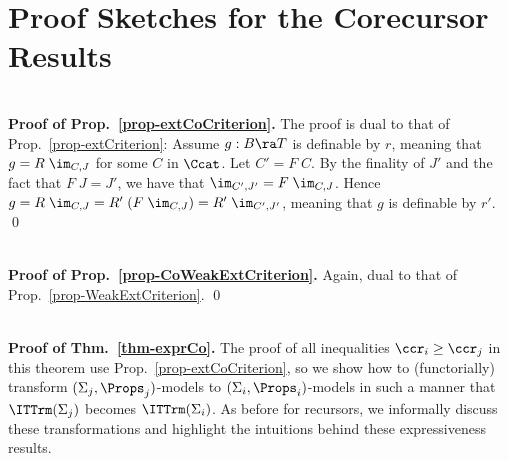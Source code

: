 \section{Proof Sketches for the Corecursor Results} 
\label{app-proofCoSketches} 


\ \\
\textbf{Proof of Prop.~\ref{prop-extCoCriterion}.}  
The proof is dual to that of Prop.~\ref{prop-extCriterion}: 
Assume $g:B \ra T$ is definable by $r$, meaning that $g = R\;\im_{C,J}$ for some $C$ in $\Ccat$. 
Let $C' = F\;C$. 
By the finality of $J'$ and the fact that $F\;J = J'$, we have that 
$\im_{C',J'} = F\;\im_{C,J}$. Hence 
%
$g = R\;\im_{C,J} = R'\;(F\;\im_{C,J}) = R'\;\im_{C',J'} $, 
meaning that $g$ is definable by $r'$.  \qed

\ \\
\textbf{Proof of Prop.~\ref{prop-CoWeakExtCriterion}.}  Again, dual to that of 
Prop.~\ref{prop-WeakExtCriterion}. \qed 

\ \\
\textbf{Proof of Thm.~\ref{thm-exprCo}.}   
%
The proof of all inequalities $\ccr_i \geq \ccr_j$  in this theorem use Prop.~\ref{prop-extCoCriterion}, 
so we show how to (functorially) 
transform $(\Sigma_j,\Props_j)$-models to $(\Sigma_i,\Props_i)$-models in such a manner that $\ITTrm(\Sigma_j)$ 
becomes $\ITTrm(\Sigma_i)$. As before for recursors, we informally discuss these transformations and highlight the intuitions behind these expressiveness results. 

